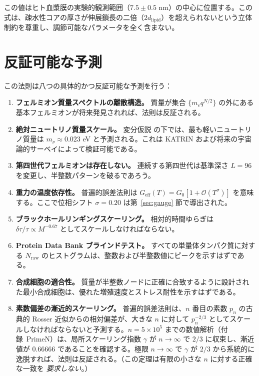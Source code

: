 \documentclass[12pt,a4paper]{article}
\theoremstyle{remark}
\begin{document}
	この値はヒト血漿膜の実験的観測範囲（\(7.5 \pm 0.5\) nm）の中心に位置する。この式は、疎水性コアの厚さが伸展鎖長の二倍（\(2 d_{\mathrm{lipid}}\)）を超えられないという立体制約を尊重し、調節可能なパラメータを全く含まない。
	
	\section{反証可能な予測}
	\label{sec:predictions}
	
	この法則は八つの具体的かつ反証可能な予測を行う：
	
	\begin{enumerate}[label=(\arabic*)]
		\item \textbf{フェルミオン質量スペクトルの離散構造。} 質量が集合 \(\{m_e q^{N/2}\}\) の外にある基本フェルミオンが将来発見されれば、法則は反証される。
		\item \textbf{絶対ニュートリノ質量スケール。} 変分仮説 \cite{AppendixLambda} の下では、最も軽いニュートリノ質量は \(m_{\nu} \approx 0.023\) eV と予測される。これは KATRIN および将来の宇宙論的サーベイによって検証可能である。
		\item \textbf{第四世代フェルミオンは存在しない。} 連続する第四世代は基準深さ \(L = 96\) を変更し、半整数パターンを破るであろう。
		\item \textbf{重力の温度依存性。} 普遍的誤差法則は \(G_{\mathrm{eff}}(T) = G_0[1 + \mathcal{O}(T^{\sigma})]\) を意味する。ここで位相シフト \(\sigma = 0.20\) は第~\ref{sec:gauge} 節で導出された。
		\item \textbf{ブラックホールリンギングスケーリング。} 相対的時間ゆらぎは \(\delta\tau/\tau \propto M^{-0.67}\) としてスケールしなければならない。
		\item \textbf{Protein Data Bank ブラインドテスト。} すべての単量体タンパク質に対する \(N_{\mathrm{raw}}\) のヒストグラムは、整数および半整数値にピークを示すはずである。
		\item \textbf{合成細胞の適合性。} 質量が半整数ノードに正確に合致するように設計された最小合成細胞は、優れた増殖速度とストレス耐性を示すはずである。
		\item \textbf{素数偏差の漸近的スケーリング。} 普遍的誤差法則は、\(n\) 番目の素数 \(p_n\) の古典的 Rosser 近似からの相対偏差が、大きな \(n\) に対して \(p_n^{-2/3}\) としてスケールしなければならないと予測する。\(n = 5\times10^5\) までの数値解析（付録~PrimeN）は、局所スケーリング指数 \(\gamma\) が \(n\to\infty\) で \(2/3\) に収束し、漸近値が \(0.66666\) であることを確認する。極限 \(n\to\infty\) で \(\gamma\) が \(2/3\) から系統的に逸脱すれば、法則は反証される。（この定理は有限の小さな \(n\) に対する正確な一致を \emph{要求しない}。）
	\end{enumerate}
	
\end{document}
